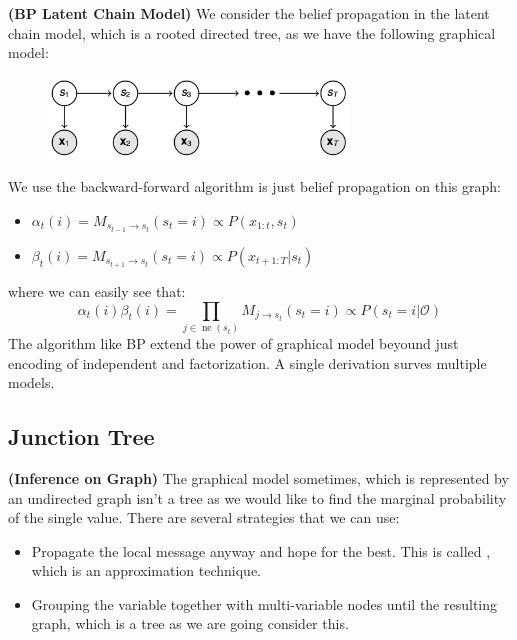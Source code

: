\begin{remark}{\textbf{(BP Latent Chain Model)}}
    We consider the belief propagation in the latent chain model, which is a rooted directed tree, as we have the following graphical model:
    \begin{figure}[H]
        \centering
        \includegraphics[width=8cm]{img/img8.png}
    \end{figure}  
    We use the backward-forward algorithm is just belief propagation on this graph:
    \begin{itemize}
        \item $\alpha_t(i) = M_{s_{t-1}\rightarrow s_t}(s_t = i) \propto P(x_{1:t}, s_t)$ 
        \item $\beta_t(i) = M_{s_{t+1}\rightarrow s_t}(s_t = i)\propto P(x_{t+1: T} | s_t)$
    \end{itemize}
    where we can easily see that:
    \begin{equation*}
        \alpha_t(i)\beta_t(i) = \prod_{j\in\operatorname{ne}(s_t)} M_{j\rightarrow s_t}(s_t = i) \propto P(s_t = i | \mathcal{O}) 
    \end{equation*}
    The algorithm like BP extend the power of graphical model beyound just encoding of independent and factorization. A single derivation surves multiple models.
\end{remark}

\subsection{Junction Tree}

\begin{remark}{\textbf{(Inference on Graph)}}
    The graphical model sometimes, which is represented by an undirected graph isn't a tree as we would like to find the marginal probability of the single value. There are several strategies that we can use:
    \begin{itemize}
        \item Propagate the local message anyway and hope for the best. This is called , which is an approximation technique. 
        \item Grouping the variable together with multi-variable nodes until the resulting graph, which is a tree as we are going consider this. 
    \end{itemize}
\end{remark}

